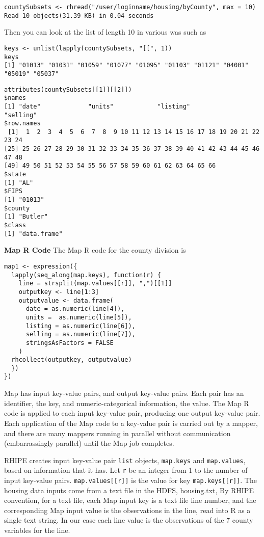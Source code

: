 \begin{verbatim}
countySubsets <- rhread("/user/loginname/housing/byCounty", max = 10)
Read 10 objects(31.39 KB) in 0.04 seconds
\end{verbatim}

Then you can look at the list of length 10 in various was such as

\begin{verbatim}
keys <- unlist(lapply(countySubsets, "[[", 1))
keys
[1] "01013" "01031" "01059" "01077" "01095" "01103" "01121" "04001" "05019" "05037"
\end{verbatim}

\begin{verbatim}
attributes(countySubsets[[1]][[2]])
$names
[1] "date"             "units"            "listing"             "selling"
$row.names
 [1]  1  2  3  4  5  6  7  8  9 10 11 12 13 14 15 16 17 18 19 20 21 22 23 24 
[25] 25 26 27 28 29 30 31 32 33 34 35 36 37 38 39 40 41 42 43 44 45 46 47 48 
[49] 49 50 51 52 53 54 55 56 57 58 59 60 61 62 63 64 65 66
$state
[1] "AL"
$FIPS
[1] "01013"
$county
[1] "Butler"
$class
[1] "data.frame"
\end{verbatim}

\textbf{Map R Code}
The Map R code for the county division is

\begin{verbatim}
map1 <- expression({
  lapply(seq_along(map.keys), function(r) {
    line = strsplit(map.values[[r]], ",")[[1]]
    outputkey <- line[1:3]
    outputvalue <- data.frame(
      date = as.numeric(line[4]),
      units =  as.numeric(line[5]),
      listing = as.numeric(line[6]),
      selling = as.numeric(line[7]),
      stringsAsFactors = FALSE
    )
  rhcollect(outputkey, outputvalue)
  })
})
\end{verbatim}

Map has input key-value pairs, and output key-value pairs. Each pair has an
identifier, the key, and numeric-categorical information, the value. 
The Map R code is applied to each input key-value pair, producing one
output key-value pair. Each application of the Map code to a
key-value pair is carried out by a mapper, and there are many mappers running
in parallel without communication (embarrassingly parallel) until the Map job
completes.

RHIPE creates input key-value pair \texttt{list} objects, \texttt{map.keys} and
\texttt{map.values}, based on information that it has.
Let \texttt{r} be an integer from 1 to the number of input key-value pairs.
\texttt{map.values[[r]]} is the value for key \texttt{map.keys[[r]]}.
The housing data inputs come from a text file in the HDFS, housing.txt,
By RHIPE convention, for a text file, each Map input key is a text file line
number, and the corresponding  Map input value is the observations in the line,
read into R as a single text string.
In our case each line value is the observations of the 7 county variables for the line.

